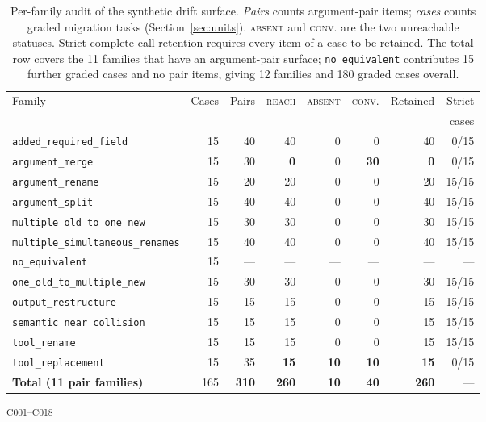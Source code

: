 \documentclass[11pt]{article}
\newcommand{\ledger}[1]{\textsuperscript{\textsf{\scriptsize #1}}}
\newcommand{\st}[1]{\textsc{\small #1}}
\newcommand{\dfam}[1]{\texttt{#1}}
\begin{document}
\begin{table}[t]
\centering
\small
\caption{Per-family audit of the synthetic drift surface. \emph{Pairs} counts
argument-pair items; \emph{cases} counts graded migration tasks
(Section~\ref{sec:units}). \st{absent} and \st{conv.} are the two unreachable
statuses. Strict complete-call retention requires every item of a case to be
retained. The total row covers the 11 families that have an argument-pair
surface; \dfam{no\_equivalent} contributes 15 further graded cases and no pair
items, giving 12 families and 180 graded cases overall.}
\label{tab:families}
\begin{tabular}{@{}lrrrrrrr@{}}
\toprule
Family & Cases & Pairs & \st{reach} & \st{absent} & \st{conv.} & Retained & Strict \\
       &       &       &            &             &            &          & cases  \\
\midrule
\dfam{added\_required\_field}         & 15 & 40 & 40 & 0  & 0  & 40 & 0/15 \\
\dfam{argument\_merge}                & 15 & 30 & \textbf{0}  & 0  & \textbf{30} & \textbf{0}  & 0/15 \\
\dfam{argument\_rename}               & 15 & 20 & 20 & 0  & 0  & 20 & 15/15 \\
\dfam{argument\_split}                & 15 & 40 & 40 & 0  & 0  & 40 & 15/15 \\
\dfam{multiple\_old\_to\_one\_new}    & 15 & 30 & 30 & 0  & 0  & 30 & 15/15 \\
\dfam{multiple\_simultaneous\_renames}& 15 & 40 & 40 & 0  & 0  & 40 & 15/15 \\
\dfam{no\_equivalent}                 & 15 & --- & --- & --- & --- & --- & --- \\
\dfam{one\_old\_to\_multiple\_new}    & 15 & 30 & 30 & 0  & 0  & 30 & 15/15 \\
\dfam{output\_restructure}            & 15 & 15 & 15 & 0  & 0  & 15 & 15/15 \\
\dfam{semantic\_near\_collision}      & 15 & 15 & 15 & 0  & 0  & 15 & 15/15 \\
\dfam{tool\_rename}                   & 15 & 15 & 15 & 0  & 0  & 15 & 15/15 \\
\dfam{tool\_replacement}              & 15 & 35 & \textbf{15} & \textbf{10} & \textbf{10} & \textbf{15} & 0/15 \\
\midrule
\textbf{Total (11 pair families)}    & 165 & \textbf{310} & \textbf{260} & \textbf{10} & \textbf{40} & \textbf{260} & --- \\
\bottomrule
\end{tabular}
\ledger{C001--C018}
\end{table}
\end{document}
